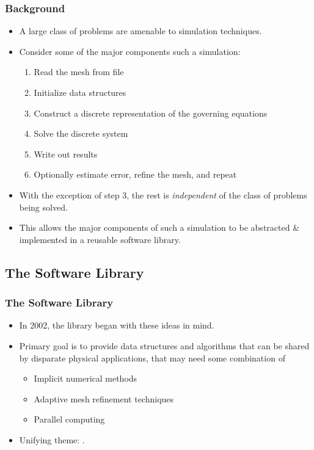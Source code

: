  

\frame
{
  \frametitle{Background}                 
  \begin{itemize}
    \item A large class of problems are amenable to  simulation techniques.
    \item Consider some of the major components such a simulation:
      \pause
      \begin{enumerate}
        \item Read the mesh from file
        \item Initialize data structures
        \item Construct a discrete representation of the governing equations
        \item Solve the discrete system
        \item Write out results
        \item Optionally estimate error, refine the mesh, and repeat
      \end{enumerate}

    \pause
    \item With the exception of step 3, the rest is \emph{independent} of the class of problems being solved.
    \pause
    \item This allows the major components of such a simulation to be abstracted \& implemented in a reusable software library.
  \end{itemize}
}


 

\subsection{The \libmesh{} Software Library}
\frame
{
  \frametitle{The \libmesh{} Software Library}
  \begin{itemize}
    \item In 2002, the \libmesh{} library began with these ideas in mind.
    \item Primary goal is to provide data structures and algorithms that can be shared by disparate physical applications, that may need some combination of
      \begin{itemize}
      \item Implicit numerical methods
      \item Adaptive mesh refinement techniques
      \item Parallel computing
      \end{itemize}
    \item Unifying theme: .
  \end{itemize}
}



